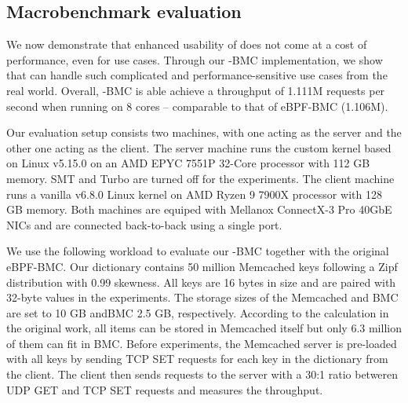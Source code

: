 

\subsection{Macrobenchmark evaluation}
\label{eval:macro}
We now demonstrate that enhanced usability of \projname{} does not come at a
    cost of performance, even for  use cases.
Through our \projname{}-BMC implementation, we show that \projname{} can handle
    such complicated and performance-sensitive use cases from the real world.
Overall, \projname{}-BMC is able achieve a throughput of 1.111M requests per
    second when running on 8 cores -- comparable to that of eBPF-BMC (1.106M).

%

Our evaluation setup consists two machines, with one
    acting as the server and the other one acting as the client.
The server machine runs the \projname{} custom kernel based on Linux v5.15.0 on
    an AMD EPYC 7551P 32-Core processor with 112 GB memory.
SMT and Turbo are turned off for the experiments.
The client machine runs a vanilla v6.8.0 Linux kernel on AMD Ryzen 9 7900X
    processor with 128 GB memory.
Both machines are equiped with Mellanox ConnectX-3 Pro 40GbE NICs and are
    connected back-to-back using a single port.


We use the following workload to evaluate our \projname{}-BMC together with the
    original eBPF-BMC.
Our dictionary contains 50 million Memcached keys following a Zipf
    distribution with 0.99 skewness.
All keys are 16 bytes in size and are paired with 32-byte values in the
    experiments.
The storage sizes of the Memcached and BMC are set to 10 GB andBMC 2.5 GB,
    respectively.
According to the calculation in the original work, all items
    can be stored in Memcached itself but only 6.3 million of them can fit in
    BMC.
Before experiments, the Memcached server is pre-loaded with all keys by
    sending TCP SET requests for each key in the dictionary from the client.
The client then sends requests to the server with a 30:1 ratio betweren UDP GET and
    TCP SET requests and measures the throughput.

